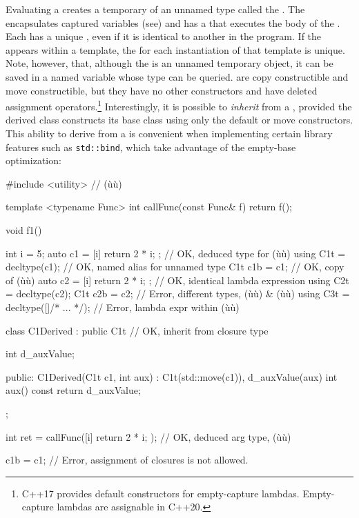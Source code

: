 Evaluating a  creates a temporary
 of an unnamed type called the . The  encapsulates captured variables (see\linebreak[4]
) and has a  that
executes the body of the . Each  has a unique , even if it is identical
to another  in the program. If the
 appears within a template, the
 for each instantiation of that template is unique.
Note, however, that, although the  is an unnamed
temporary object, it can be saved in a named variable whose type can be
queried.  are copy constructible and move
constructible, but they have no other constructors and have deleted
assignment operators.{\cprotect\footnote{C++17 provides default
constructors for empty-capture lambdas. Empty-capture lambdas are
  assignable in C++20.}} Interestingly, it is possible to \emph{inherit}
from a , provided the derived class constructs its
 base class using only the default or move
constructors. This ability to derive from a  is
convenient when implementing certain library features such as
\lstinline!std::bind!, which take advantage of the empty-base optimization:

\begin{emcppslisting}
#include <utility>  // (ù{}ù)

template <typename Func>
int callFunc(const Func& f) { return f(); }

void f1()
{
    int   i   = 5;
    auto  c1  = [i]{ return 2 * i; };   // OK, deduced type for (ù{}ù)
    using C1t = decltype(c1);           // OK, named alias for unnamed type
    C1t   c1b = c1;                     // OK, copy of (ù{}ù)
    auto  c2  = [i]{ return 2 * i; };   // OK, identical lambda expression
    using C2t = decltype(c2);
    C1t   c2b = c2;                     // Error, different types, (ù{}ù) & (ù{}ù)
    using C3t = decltype([]{/* ... */});  // Error, lambda expr within (ù{}ù)

    class C1Derived : public C1t        // OK, inherit from closure type
    {
        int d_auxValue;

    public:
        C1Derived(C1t c1, int aux) : C1t(std::move(c1)), d_auxValue(aux) { }
        int aux() const { return d_auxValue; }
    };

    int ret = callFunc([i]{ return 2 * i; });  // OK, deduced arg type, (ù{}ù)

    c1b = c1;  // Error, assignment of closures is not allowed.
}
\end{emcppslisting}


